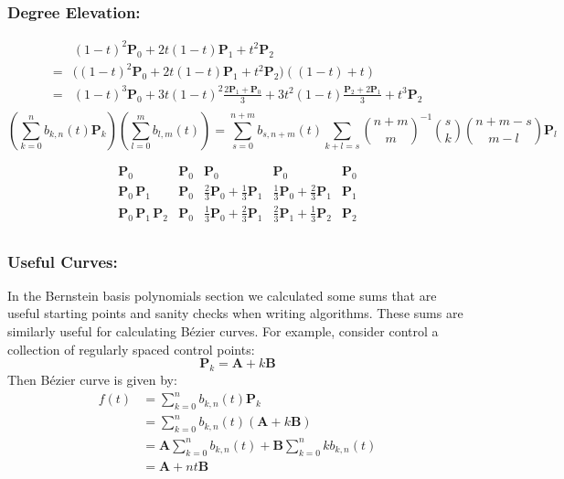 \subsubsection{Degree Elevation:}
\[\begin{aligned}
	&(1-t)^2\mathbf{P}_0+2t(1-t)\mathbf{P}_1+t^2\mathbf{P}_2\\
	=&\big((1-t)^2\mathbf{P}_0+2t(1-t)\mathbf{P}_1+t^2\mathbf{P}_2\big)((1-t)+t)\\
	=&(1-t)^3\mathbf{P}_0+3t(1-t)^2\frac{2\mathbf{P}_1+\mathbf{P}_0}{3}+3t^2(1-t)\frac{\mathbf{P}_2+2\mathbf{P}_1}{3} + t^3\mathbf{P}_2\\
\end{aligned}\]
\[
	\left(\sum_{k=0}^nb_{k,n}(t)\mathbf{P}_k\right)\left(\sum_{l=0}^mb_{l,m}(t)\right) = 
	\sum_{s=0}^{n+m}b_{s,n+m}(t)\sum_{k+l=s}\binom{n+m}{m}^{-1}\binom{s}{k}\binom{n+m-s}{m-l}\mathbf{P}_l
\]

\[\begin{array}{|c|cccc|}
	\mathbf{P}_0&\mathbf{P}_0&\mathbf{P}_0&\mathbf{P}_0&\mathbf{P}_0\\
	\mathbf{P}_0\,\mathbf{P}_1&\mathbf{P}_0&\frac{2}{3}\mathbf{P}_0+\frac{1}{3}\mathbf{P}_1&\frac{1}{3}\mathbf{P}_0+\frac{2}{3}\mathbf{P}_1&\mathbf{P}_1\\
	\mathbf{P}_0\,\mathbf{P}_1\,\mathbf{P}_2&\mathbf{P}_0&\frac{1}{3}\mathbf{P}_0+\frac{2}{3}\mathbf{P}_1&\frac{2}{3}\mathbf{P}_1+\frac{1}{3}\mathbf{P}_2&\mathbf{P}_2\\
\end{array}\]

\subsubsection{Useful Curves:}
In the Bernstein basis polynomials section we calculated some sums that are useful starting points and sanity checks when writing algorithms.
These sums are similarly useful for calculating Bézier curves.
For example,
consider control a collection of regularly spaced control points:
\[\mathbf{P}_k = \mathbf{A}+k\mathbf{B}\]
Then Bézier curve is given by:
\[\begin{aligned}
	f(t) &= \sum_{k=0}^nb_{k,n}(t)\mathbf{P}_k\\
	&= \sum_{k=0}^nb_{k,n}(t)(\mathbf{A}+k\mathbf{B})\\
	&= \mathbf{A}\sum_{k=0}^nb_{k,n}(t)+\mathbf{B}\sum_{k=0}^nkb_{k,n}(t)\\
	&= \mathbf{A}+nt\mathbf{B}\\
\end{aligned}\]



